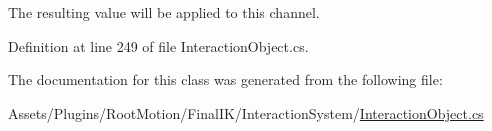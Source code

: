 The resulting value will be applied to this channel. 



Definition at line 249 of file Interaction\+Object.\+cs.



The documentation for this class was generated from the following file\+:\begin{DoxyCompactItemize}
\item 
Assets/\+Plugins/\+Root\+Motion/\+Final\+I\+K/\+Interaction\+System/\mbox{\hyperlink{_interaction_object_8cs}{Interaction\+Object.\+cs}}\end{DoxyCompactItemize}
